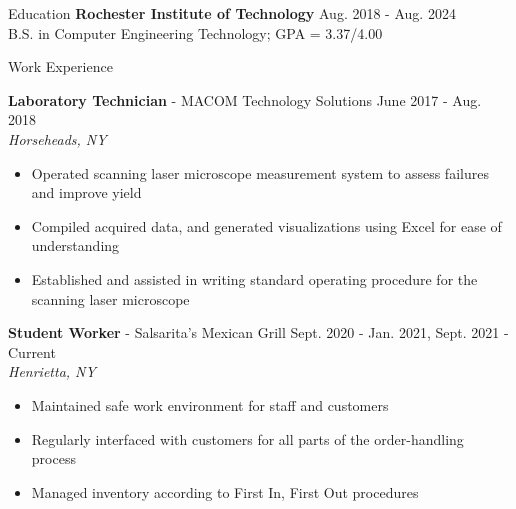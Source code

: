 \documentclass[UTF-8]{resume} \usepackage{multirow}
\begin{document}
\begin{rSection}{Education}
	{\bf Rochester Institute of Technology}  \hfill {Aug. 2018 - Aug. 2024}\\
	B.S. in Computer Engineering Technology; GPA = 3.37/4.00
\end{rSection}


\begin{rSection}{Work Experience}
	\vspace{-1.6em}
	\item \textbf{Laboratory Technician} {- MACOM Technology Solutions} \hfill {June 2017 - Aug. 2018}\\
	\emph{Horseheads, NY}
	\begin{itemize}
		\itemsep -6pt {}
		\item Operated scanning laser microscope measurement system to assess failures and improve yield
		\item Compiled acquired data, and generated visualizations using Excel for ease of understanding
		\item Established and assisted in writing standard operating procedure for the scanning laser microscope
	\end{itemize}
	\item \textbf{Student Worker} {- Salsarita's Mexican Grill} \hfill {Sept. 2020 - Jan. 2021, Sept. 2021 - Current}\\
	\emph{Henrietta, NY}
	\begin{itemize}
		\itemsep -6pt {}
		\item Maintained safe work environment for staff and customers
		\item Regularly interfaced with customers for all parts of the order-handling process
		\item Managed inventory according to First In, First Out procedures
	\end{itemize}
\end{rSection}
\end{document}
